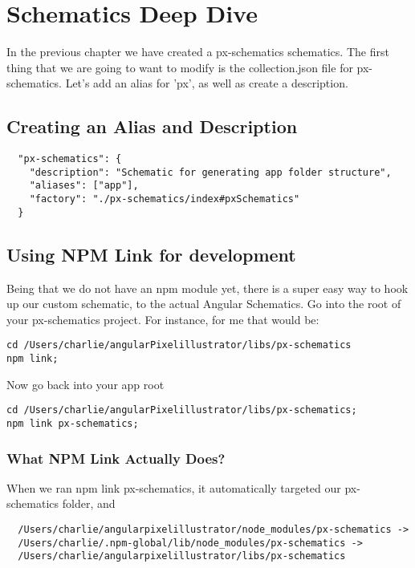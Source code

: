 
\chapter{ Schematics Deep Dive }

In the previous chapter we have created a px-schematics schematics. The first
thing that we are going to want to modify is the collection.json file for
px-schematics. Let's add an alias for 'px', as well as create a description.

\section{ Creating an Alias and Description }
\begin{lstlisting}
  "px-schematics": {
    "description": "Schematic for generating app folder structure",
    "aliases": ["app"],
    "factory": "./px-schematics/index#pxSchematics"
  }
\end{lstlisting}

\section{ Using NPM Link for development }
Being that we do not have an npm module yet, there is a super easy way to hook
up our custom schematic, to the actual Angular Schematics. Go into the root
of your px-schematics project. For instance, for me that would be:
\begin{verbatim}
cd /Users/charlie/angularPixelillustrator/libs/px-schematics
npm link;
\end{verbatim}

Now go back into your app root
\begin{verbatim}
cd /Users/charlie/angularPixelillustrator/libs/px-schematics;
npm link px-schematics;
\end{verbatim}

\subsection{ What NPM Link Actually Does? }
When we ran npm link px-schematics, it automatically targeted our px-schematics
folder, and
\begin{lstlisting}
  /Users/charlie/angularpixelillustrator/node_modules/px-schematics ->
  /Users/charlie/.npm-global/lib/node_modules/px-schematics ->
  /Users/charlie/angularpixelillustrator/libs/px-schematics
\end{lstlisting}

